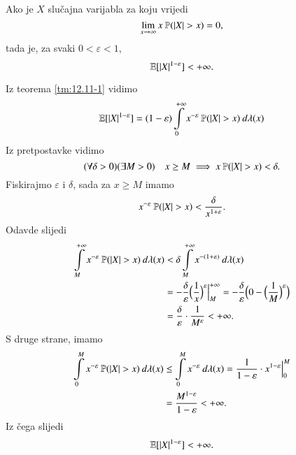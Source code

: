 \begin{zad} \label{zad:12.13}
    Ako je $X$ slu\v cajna varijabla za koju vrijedi
    \begin{equation*}
        \lim\limits_{x \to \infty} x \: \mathbb{P}({|X| > x}) = 0,
    \end{equation*}
    tada je, za svaki $0 < \varepsilon < 1$,
    \begin{equation*}
        \mathbb{E} [ |X|^{1 - \varepsilon} ] < +\infty.
    \end{equation*}
\end{zad}

\begin{rj}[\ref{zad:12.13}]
    Iz teorema \ref{tm:12.11-1} vidimo
    \begin{equation*}
            \mathbb{E} [|X|^{1-\varepsilon}] = (1 - \varepsilon) \int\limits_{0}^{+\infty} x^{-\varepsilon} \: \mathbb{P} (|X| > x) \: d \lambda (x)
    \end{equation*}
    Iz pretpostavke vidimo
    \begin{equation*}
        (\forall \delta > 0) (\exists M > 0) \quad x \geq M \implies x \: \mathbb{P} (|X| > x) < \delta.
    \end{equation*}
    Fiskirajmo $\varepsilon$ i $\delta$, sada za $x \geq M$ imamo
    \begin{equation*}
        x^{-\varepsilon} \: \mathbb{P} (|X| > x) < \frac{\delta}{x^{1 + \varepsilon}}.
    \end{equation*}
    Odavde slijedi
    \begin{equation*}
        \begin{aligned}
            \int\limits_{M}^{+\infty} x^{-\varepsilon} \: \mathbb{P} (|X| > x) \: d \lambda (x) &< \delta \int\limits_{M}^{+\infty} x^{-(1 + \varepsilon)} \: d \lambda (x)\\
            &= -\frac{\delta}{\varepsilon} \Big( \frac{1}{x} \Big)^{\varepsilon} \Big|_{M}^{+\infty} = - \frac{\delta}{\varepsilon} \Big(0 - \Big( \frac{1}{M} \Big)^\varepsilon \Big)\\
            &= \frac{\delta}{\varepsilon} \cdot \frac{1}{M^\varepsilon} < +\infty.
        \end{aligned} 
    \end{equation*}
    S druge strane, imamo
    \begin{equation*}
        \begin{aligned}
            \int\limits_{0}^{M} x^{-\varepsilon} \: \mathbb{P} (|X| > x) \: d \lambda (x) &\leq \int\limits_{0}^{M} x^{-\varepsilon} \: d \lambda (x) = \frac{1}{1 - \varepsilon} \cdot x^{1 - \varepsilon} \Big|_0^M\\
            &= \frac{M^{1 - \varepsilon}}{1 - \varepsilon} < +\infty.
        \end{aligned}
    \end{equation*}
    Iz \v cega slijedi
    \begin{equation*}
        \mathbb{E} [|X|^{1 - \varepsilon}] < +\infty.
    \end{equation*}
\end{rj}

